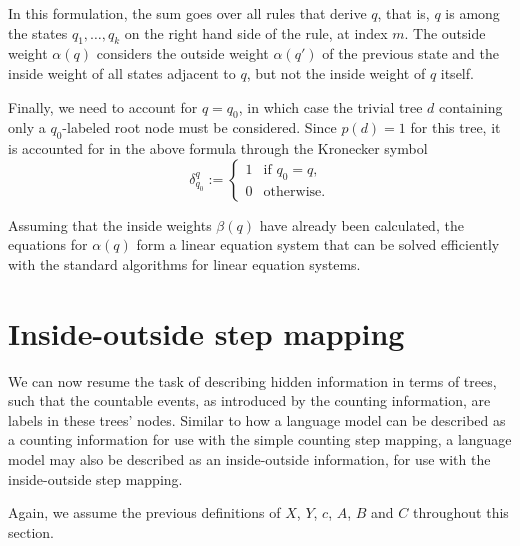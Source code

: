 In this formulation, the sum goes over all rules that derive $q$, that is, $q$
is among the states $q_1,\ldots,q_k$ on the right hand side of the rule, at
index $m$. The outside weight $\alpha(q)$ considers the outside weight
$\alpha(q')$ of the previous state and the inside weight of all states adjacent
to $q$, but not the inside weight of $q$ itself.

Finally, we need to account for $q=q_0$, in which case the trivial tree $d$ containing only a $q_0$-labeled root node must be considered. Since $p(d)=1$ for this tree, it is accounted for in the above formula through the Kronecker symbol
\[
 \delta_{q_0}^q := \begin{cases}
  1 & \text{if } q_0 = q, \\
  0 & \text{otherwise}.
 \end{cases}
\]

Assuming that the inside weights $\beta(q)$ have already been calculated, the
equations for $\alpha(q)$ form a linear equation system that can be solved
efficiently with the standard algorithms for linear equation systems.

\section{Inside-outside step mapping}

We can now resume the task of describing hidden information in terms of trees,
such that the countable events, as introduced by the counting information, are
labels in these trees' nodes. Similar to how a language model can be described
as a counting information for use with the simple counting step mapping, a
language model may also be described as an inside-outside information, for use
with the inside-outside step mapping.

Again, we assume the previous definitions of $X$, $Y$, $c$, $A$, $B$ and $C$
throughout this section.

